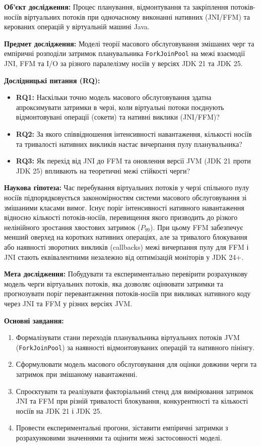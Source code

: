 \textbf{Об'єкт дослідження:} Процес планування, відмонтування та закріплення потоків-носіїв віртуальних потоків при одночасному виконанні нативних (JNI/FFM) та керованих операцій у віртуальній машині Java.

\textbf{Предмет дослідження:} Моделі теорії масового обслуговування змішаних черг та емпіричні розподіли затримок планувальника \texttt{ForkJoinPool} на межі взаємодії JNI, FFM та I/O за різного паралелізму носіїв у версіях JDK 21 та JDK 25.

\textbf{Дослідницькі питання (RQ):}
\begin{itemize}[wide]
    \item \textbf{RQ1:} Наскільки точно модель масового обслуговування здатна апроксимувати затримки в черзі, коли віртуальні потоки поєднують відмонтовувані операції (сокети) та нативні виклики (JNI/FFM)?
    \item \textbf{RQ2:} За якого співвідношення інтенсивності навантаження, кількості носіїв та тривалості нативних викликів настає вичерпання пулу планувальника?
    \item \textbf{RQ3:} Як перехід від JNI до FFM та оновлення версії JVM (JDK 21 проти JDK 25) впливають на теоретичні межі стійкості черги?
\end{itemize}

\textbf{Наукова гіпотеза:} Час перебування віртуальних потоків у черзі спільного пулу носіїв підпорядковується закономірностям системи масового обслуговування зі змішаними класами вимог. Існує поріг інтенсивності нативного навантаження відносно кількості потоків-носіїв, перевищення якого призводить до різкого нелінійного зростання хвостових затримок ($P_{99}$). При цьому FFM забезпечує менший оверхед на коротких нативних операціях, але за тривалого блокування або наявності зворотних викликів (callbacks) межі вичерпання пулу для FFM і JNI стають еквівалентними незалежно від оптимізацій моніторів у JDK 24+.

\textbf{Мета дослідження:} Побудувати та експериментально перевірити розрахункову модель черги віртуальних потоків, яка дозволяє оцінювати затримки та прогнозувати поріг перевантаження потоків-носіїв при викликах нативного коду через JNI та FFM у різних версіях JVM.

\textbf{Основні завдання:}
\begin{enumerate}[wide]
    \item Формалізувати стани переходів планувальника віртуальних потоків JVM (\texttt{ForkJoinPool}) за наявності відмонтовуваних операцій та нативного пінінгу.
    \item Сформулювати модель масового обслуговування для оцінки довжини черги та затримок при змішаному навантаженні.
    \item Спроєктувати та реалізувати факторіальний стенд для вимірювання затримок JNI та FFM при різній тривалості блокування, конкурентності та кількості носіїв на JDK 21 і JDK 25.
    \item Провести експериментальні прогони, зіставити емпіричні затримки з розрахунковими значеннями та оцінити межі застосовності моделі.
\end{enumerate}

